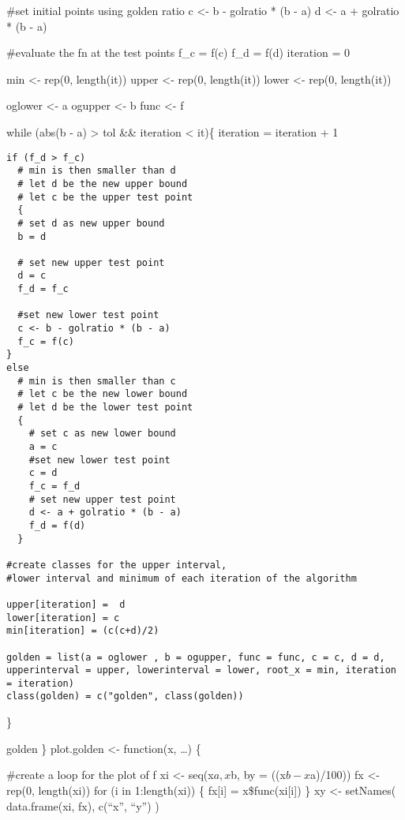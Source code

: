\documentclass[]{article}
\begin{document}
\#set initial points using golden ratio c \textless{}- b - golratio * (b
- a) d \textless{}- a + golratio * (b - a)

\#evaluate the fn at the test points f\_c = f(c) f\_d = f(d) iteration =
0

min \textless{}- rep(0, length(it)) upper \textless{}- rep(0,
length(it)) lower \textless{}- rep(0, length(it))

oglower \textless{}- a ogupper \textless{}- b func \textless{}- f

while (abs(b - a) \textgreater{} tol \&\& iteration \textless{} it)\{
iteration = iteration + 1

\begin{verbatim}
if (f_d > f_c)
  # min is then smaller than d
  # let d be the new upper bound
  # let c be the upper test point
  {
  # set d as new upper bound
  b = d

  # set new upper test point
  d = c
  f_d = f_c

  #set new lower test point
  c <- b - golratio * (b - a)
  f_c = f(c)
}
else
  # min is then smaller than c
  # let c be the new lower bound
  # let d be the lower test point
  {
    # set c as new lower bound
    a = c
    #set new lower test point
    c = d
    f_c = f_d
    # set new upper test point
    d <- a + golratio * (b - a)
    f_d = f(d)
  }

#create classes for the upper interval,
#lower interval and minimum of each iteration of the algorithm

upper[iteration] =  d
lower[iteration] = c
min[iteration] = (c(c+d)/2)

golden = list(a = oglower , b = ogupper, func = func, c = c, d = d, upperinterval = upper, lowerinterval = lower, root_x = min, iteration = iteration)
class(golden) = c("golden", class(golden))
\end{verbatim}

\}

golden \} plot.golden \textless{}- function(x, \ldots{}) \{

\#create a loop for the plot of f xi \textless{}- seq(x\(a, x\)b, by =
((x\(b-x\)a)/100)) fx \textless{}- rep(0, length(xi)) for (i in
1:length(xi)) \{ fx{[}i{]} = x\$func(xi{[}i{]}) \} xy \textless{}-
setNames( data.frame(xi, fx), c(``x'', ``y'') )
\end{document}
